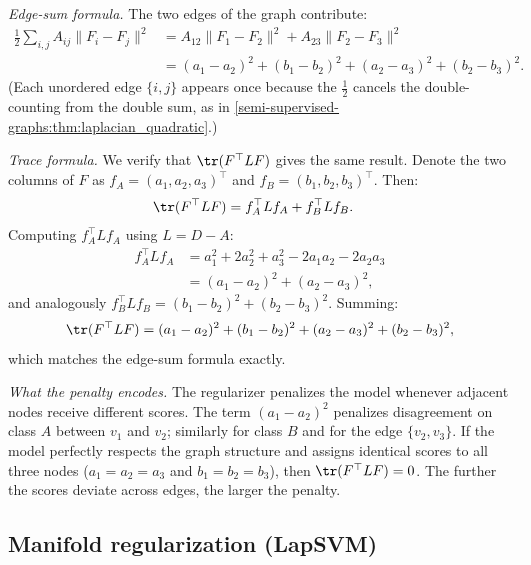 \begin{notechapter}
\begin{example}
\emph{Edge-sum formula.} The two edges of the graph contribute:
\begin{align*}
\frac{1}{2}\sum_{i,j}A_{ij}\|F_i - F_j\|^2
&= A_{12}\|F_1 - F_2\|^2 + A_{23}\|F_2 - F_3\|^2 \\
&= (a_1 - a_2)^2 + (b_1 - b_2)^2
 + (a_2 - a_3)^2 + (b_2 - b_3)^2.
\end{align*}
(Each unordered edge $\{i,j\}$ appears once because the $\frac{1}{2}$ cancels
the double-counting from the double sum, as in \cref{semi-supervised-graphs:thm:laplacian_quadratic}.)

\emph{Trace formula.} We verify that $\tr(F^\top LF)$ gives the same result.
Denote the two columns of $F$ as $f_A = (a_1, a_2, a_3)^\top$ and
$f_B = (b_1, b_2, b_3)^\top$. Then:
\begin{align*}
\tr(F^\top LF) &= f_A^\top L f_A + f_B^\top L f_B.
\end{align*}
Computing $f_A^\top L f_A$ using $L = D - A$:
\begin{align*}
f_A^\top L f_A
&= a_1^2 + 2a_2^2 + a_3^2 - 2a_1 a_2 - 2a_2 a_3 \\
&= (a_1 - a_2)^2 + (a_2 - a_3)^2,
\end{align*}
and analogously $f_B^\top L f_B = (b_1 - b_2)^2 + (b_2 - b_3)^2$. Summing:
\[
\tr(F^\top LF) = (a_1-a_2)^2 + (b_1-b_2)^2 + (a_2-a_3)^2 + (b_2-b_3)^2,
\]
which matches the edge-sum formula exactly.

\emph{What the penalty encodes.} The regularizer penalizes the model
whenever adjacent nodes receive different scores. The term $(a_1 - a_2)^2$
penalizes disagreement on class $A$ between $v_1$ and $v_2$; similarly for
class $B$ and for the edge $\{v_2, v_3\}$. If the model perfectly respects
the graph structure and assigns identical scores to all three nodes
($a_1 = a_2 = a_3$ and $b_1 = b_2 = b_3$), then $\tr(F^\top LF) = 0$.
The further the scores deviate across edges, the larger the penalty.
\end{example}

\subsection{Manifold regularization (LapSVM)}
\label{semi-supervised-graphs:subsec:manifold_reg}


\end{notechapter}
